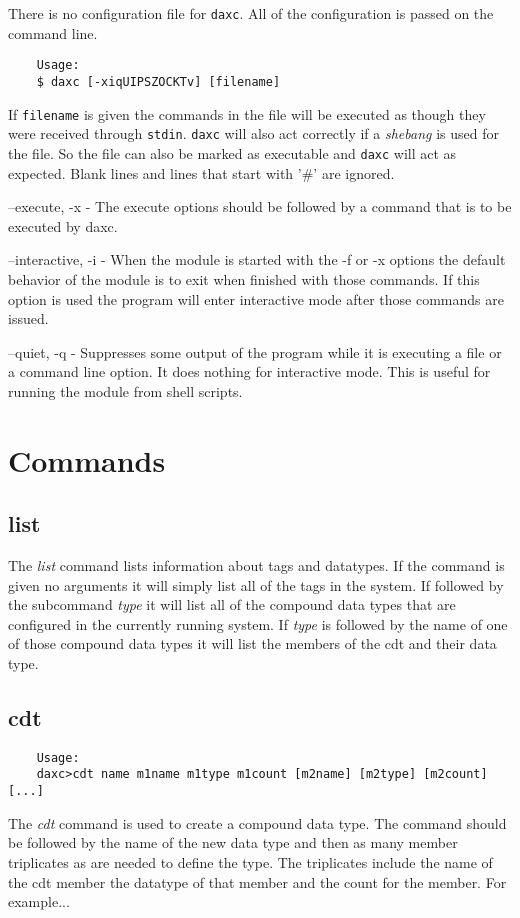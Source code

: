 	There is no configuration file for \texttt{daxc}.  All of the configuration is
	passed on the command line.

	\begin{verbatim}
	Usage:
	$ daxc [-xiqUIPSZOCKTv] [filename]
	\end{verbatim}

	If \texttt{filename} is given the commands in the file will be executed as
	though
	they were received through \texttt{stdin}.  \texttt{daxc} will also act
	correctly if a \textit{shebang} is used for the file.  So the file can also be
	marked as executable and \texttt{daxc} will act as expected.  Blank lines and
	lines that start with '\#' are ignored.

	\begin{list}{}{daxc Command Line Options}
		\item[--execute, -x] - The execute options should be followed by a command
		that is to be executed by daxc.
		\item[--interactive, -i] - When the module is started with the -f or -x
		options the default behavior of the module is to exit when finished with those
		commands.  If this option is used the program will enter interactive mode after
		those commands are issued.
		\item[--quiet, -q] - Suppresses some output of the program while it is
		executing a file or a command line option.  It does nothing for interactive
		mode.  This is useful for running the module from shell scripts.
	\end{list}

	\section{Commands}

	\subsection{list}
	The \textit{list} command lists information about tags and datatypes.  If the
	command is given no arguments it will simply list all of the tags in the system.
	If followed by the subcommand \textit{type} it will list all of the compound
	data types that are configured in the currently running system.  If
	\textit{type} is followed by the name of one of those compound data types it
	will list the members of the cdt and their data type.

	\subsection{cdt}
	\begin{verbatim}
	Usage:
	daxc>cdt name m1name m1type m1count [m2name] [m2type] [m2count] [...]
	\end{verbatim}
	The \textit{cdt} command is used to create a compound data type.  The command
	should be followed by the name of the new data type and then as many member
	triplicates as are needed to define the type.  The triplicates include the name
	of the cdt member the datatype of that member and the count for the member.  For
	example...


